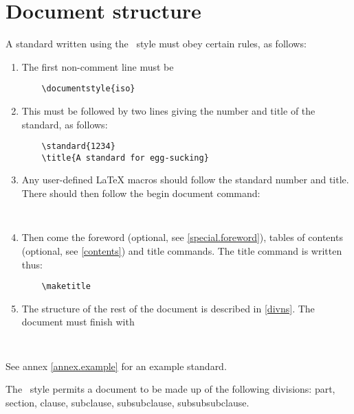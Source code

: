 \section{Document structure}
A standard written using the \iso\ style must obey certain rules, as
follows:
\begin{enumerate}
\item The first non-comment line must be
    \begin{verbatim}
    \documentstyle{iso}
    \end{verbatim}

\item This must be followed by two lines giving the number and title of
    the standard, as follows:
    \begin{verbatim}
    \standard{1234}
    \title{A standard for egg-sucking}
    \end{verbatim}

\item Any user-defined LaTeX macros should follow the standard number
    and title. There should then follow the begin document command:
    \begin{verbatim}
    
    \end{verbatim}

\item \label{structure.general.maketitle}
    Then come the foreword (optional, see \ref{special.foreword}), tables
    of contents (optional, see \ref{contents}) and title commands.
    The title command is written thus:
    \begin{verbatim}
    \maketitle
    \end{verbatim}

\item The structure of the rest of the document is described in \ref{divns}.
    The document must finish with
    \begin{verbatim}
    
    \end{verbatim}
    \end{enumerate}

See annex \ref{annex.example} for an example standard.

\label{divns}

The \iso\ style permits a document to be made up of the following divisions:
part, section, clause, subclause, subsubclause, subsubsubclause.

